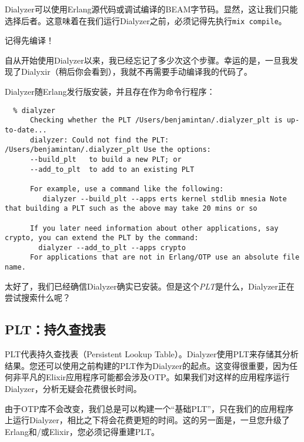 Dialyzer可以使用Erlang源代码或调试编译的BEAM字节码。显然，这让我们只能选择后者。这意味着在我们运行Dialyzer之前，必须记得先执行\texttt{mix compile}。

\begin{note}{记得先编译！} 
  
  自从开始使用Dialyzer以来，我已经忘记了多少次这个步骤。幸运的是，一旦我发现了Dialyxir（稍后你会看到），我就不再需要手动编译我的代码了。
  
\end{note}

Dialyzer随Erlang发行版安装，并且存在作为命令行程序：

\begin{code}{}\begin{verbatim}
  % dialyzer
      Checking whether the PLT /Users/benjamintan/.dialyzer_plt is up-to-date... 
      dialyzer: Could not find the PLT: /Users/benjamintan/.dialyzer_plt Use the options: 
      --build_plt   to build a new PLT; or 
      --add_to_plt  to add to an existing PLT
      
      For example, use a command like the following: 
         dialyzer --build_plt --apps erts kernel stdlib mnesia Note that building a PLT such as the above may take 20 mins or so 

      If you later need information about other applications, say crypto, you can extend the PLT by the command: 
        dialyzer --add_to_plt --apps crypto
      For applications that are not in Erlang/OTP use an absolute file name.
\end{verbatim}
\end{code}

太好了，我们已经确信Dialyzer确实已安装。但是这个\emph{PLT}是什么，Dialyzer正在尝试搜索什么呢？

\subsection{PLT：持久查找表}

PLT代表持久查找表（Persistent Lookup Table）。Dialyzer使用PLT来存储其分析结果。您还可以使用之前构建的PLT作为Dialyzer的起点。这变得很重要，因为任何非平凡的Elixir应用程序可能都会涉及OTP。如果我们对这样的应用程序运行Dialyzer，分析无疑会花费很长时间。

由于OTP库不会改变，我们总是可以构建一个``基础PLT''，只在我们的应用程序上运行Dialyzer，相比之下将会花费更短的时间。这的另一面是，一旦您升级了Erlang和/或Elixir，您必须记得重建PLT。

